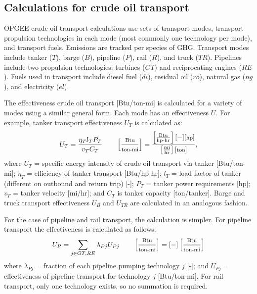 \documentclass[11pt]{report}
\newcommand{\marg}[1]{{\footnotesize\textit{\textcolor{stanford}{'#1'}}}}
\newcommand{\marginnote}[1]{\marginpar{\marg{#1}}}
\begin{document}
{\subsection{Calculations for crude oil transport}

OPGEE crude oil transport calculations use sets of transport modes, transport propulsion technologies in each mode (most commonly one technology per mode), and transport fuels. Emissions are tracked per species of GHG. Transport modes include tanker ($T$), barge ($B$), pipeline ($P$), rail ($R$), and truck ($TR$). Pipelines include two propulsion technologies: turbines ($GT$) and reciprocating engines ($RE$). Fuels used in transport include diesel fuel ($di$), residual oil ($ro$), natural gas ($ng$), and electricity ($el$). 

The effectiveness crude oil transport [Btu/ton-mi] is calculated for a variety of modes using a similar general form. Each mode has an effectiveness $U$. For example, tanker transport effectiveness $U_{T}$ is calculated as: \marginnote{Crude \\ Transport \\ 2.2}
\begin{equation}\label{eq:trans_ek}
U_T = \frac{\eta_T l_T P_T}{v_T C_T} \quad\quad \begin{footnotesize} \left[\frac{\text{Btu}}{\text{ton-mi}}\right] = \frac{\left[\frac{\text{Btu}}{\text{hp-hr}}\right] [-] [\text{hp}]}{\left[ \frac{\text{mi}}{\text{hr}} \right] [\text{ton}]} \end{footnotesize},
\end{equation}
where $U_T$ = specific energy intensity of crude oil transport via tanker [Btu/ton-mi]; $\eta_T$ = efficiency of tanker transport [Btu/hp-hr]; $l_T$ = load factor of tanker (different on outbound and return trip) [-]; $P_T$ = tanker power requirements [hp]; $v_T$ = tanker velocity [mi/hr]; and $C_T$ is tanker capacity [ton/tanker]. Barge and truck transport effectiveness $U_{B}$ and $U_{TR}$ are calculated in an analogous fashion.

For the case of pipeline and rail transport, the calculation is simpler. For pipeline transport the effectiveness is calculated as follows: \marginnote{Crude \\ Transport \\ 2.2}
\begin{equation}\label{eq:trans_ep}
U_P = \sum_{j \in GT, RE} \lambda_{Pj} U_{Pj} \quad\quad \begin{footnotesize} \left[ \frac{\text{Btu}}{\text{ton-mi}} \right] = [-]\left[ \frac{\text{Btu}}{\text{ton-mi}} \right] \end{footnotesize}
\end{equation}
where $\lambda_{Pj}$ = fraction of each pipeline pumping technology $j$ [-]; and $U_{Pj}$ = effectiveness of pipeline transport for technology $j$ [Btu/ton-mi]. For rail transport, only one technology exists, so no summation is required.

}
\end{document}
